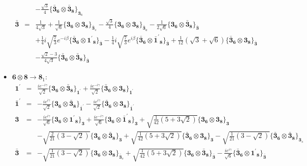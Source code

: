 \documentclass[english]{article}
\newcommand{\subcg}[3]{\big\{ {#1}\otimes{#2}\big\}^{}_{#3}}
\newcommand{\rep}[1]{\mathbf{#1}}
\begin{document}
\begin{itemize}
\begin{eqnarray*}
 & & -\frac{\sqrt{3}}{4}\subcg{\rep{\bar{3}}_{\rep{6}}}{\rep{\bar{3}}_{\rep{8}}}{\rep{3}_{a}}
\\
\rep{\bar{3}} &=& \frac{1}{4 \sqrt{3}}+\frac{1}{\sqrt{6}}\subcg{\rep{3}_{\rep{6}}}{\rep{3}_{\rep{8}}}{\rep{\bar{3}}_{s}}-\frac{\sqrt{3}}{4}\subcg{\rep{3}_{\rep{6}}}{\rep{3}_{\rep{8}}}{\rep{\bar{3}}_{a}}-\frac{1}{2 \sqrt{6}}\subcg{\rep{3}_{\rep{6}}}{\rep{\bar{3}}_{\rep{8}}}{\rep{\bar{3}}} \\ 
 & & +\frac{1}{4} i \sqrt{\frac{7}{3}} e^{-i \beta }\subcg{\rep{\bar{3}}_{\rep{6}}}{\rep{1^{\prime}}_{\rep{8}}}{\rep{\bar{3}}}-\frac{1}{4} i \sqrt{\frac{7}{3}} e^{i \beta }\subcg{\rep{\bar{3}}_{\rep{6}}}{\rep{\bar{1}^{\prime}}_{\rep{8}}}{\rep{\bar{3}}}+\frac{1}{12} \left(\sqrt{3}+\sqrt{6}\right)\subcg{\rep{\bar{3}}_{\rep{6}}}{\rep{3}_{\rep{8}}}{\rep{\bar{3}}} \\ 
 & & -\frac{\sqrt{2}-3}{4 \sqrt{3}}\subcg{\rep{\bar{3}}_{\rep{6}}}{\rep{\bar{3}}_{\rep{8}}}{\rep{\bar{3}}}
\end{eqnarray*}
\item $\rep{6}\otimes\rep{8}\to\rep{8}_{1}$:
\begin{eqnarray*}
\rep{1^{\prime}} &=& \frac{i e^{-i \gamma }}{\sqrt{2}}\subcg{\rep{3}_{\rep{6}}}{\rep{\bar{3}}_{\rep{8}}}{\rep{1^{\prime}}}+\frac{i e^{-i \gamma }}{\sqrt{2}}\subcg{\rep{\bar{3}}_{\rep{6}}}{\rep{3}_{\rep{8}}}{\rep{1^{\prime}}}
\\
\rep{\bar{1}^{\prime}} &=& -\frac{i e^{i \gamma }}{\sqrt{2}}\subcg{\rep{3}_{\rep{6}}}{\rep{\bar{3}}_{\rep{8}}}{\rep{\bar{1}^{\prime}}}-\frac{i e^{i \gamma }}{\sqrt{2}}\subcg{\rep{\bar{3}}_{\rep{6}}}{\rep{3}_{\rep{8}}}{\rep{\bar{1}^{\prime}}}
\\
\rep{3} &=& -\frac{i e^{i \gamma }}{\sqrt{6}}\subcg{\rep{3}_{\rep{6}}}{\rep{1^{\prime}}_{\rep{8}}}{\rep{3}}+\frac{i e^{-i \gamma }}{\sqrt{6}}\subcg{\rep{3}_{\rep{6}}}{\rep{\bar{1}^{\prime}}_{\rep{8}}}{\rep{3}}+\sqrt{\frac{1}{42} \left(5+3 \sqrt{2}\right)}\subcg{\rep{3}_{\rep{6}}}{\rep{3}_{\rep{8}}}{\rep{3}} \\ 
 & & -\sqrt{\frac{2}{21} \left(3-\sqrt{2}\right)}\subcg{\rep{3}_{\rep{6}}}{\rep{\bar{3}}_{\rep{8}}}{\rep{3}}+\sqrt{\frac{1}{42} \left(5+3 \sqrt{2}\right)}\subcg{\rep{\bar{3}}_{\rep{6}}}{\rep{3}_{\rep{8}}}{\rep{3}}-\sqrt{\frac{1}{21} \left(3-\sqrt{2}\right)}\subcg{\rep{\bar{3}}_{\rep{6}}}{\rep{\bar{3}}_{\rep{8}}}{\rep{3}_{s}}
\\
\rep{\bar{3}} &=& -\sqrt{\frac{1}{21} \left(3-\sqrt{2}\right)}\subcg{\rep{3}_{\rep{6}}}{\rep{3}_{\rep{8}}}{\rep{\bar{3}}_{s}}+\sqrt{\frac{1}{42} \left(5+3 \sqrt{2}\right)}\subcg{\rep{3}_{\rep{6}}}{\rep{\bar{3}}_{\rep{8}}}{\rep{\bar{3}}}-\frac{i e^{i \gamma }}{\sqrt{6}}\subcg{\rep{\bar{3}}_{\rep{6}}}{\rep{1^{\prime}}_{\rep{8}}}{\rep{\bar{3}}} \\ 

\end{eqnarray*}
\end{itemize}
\end{document}
